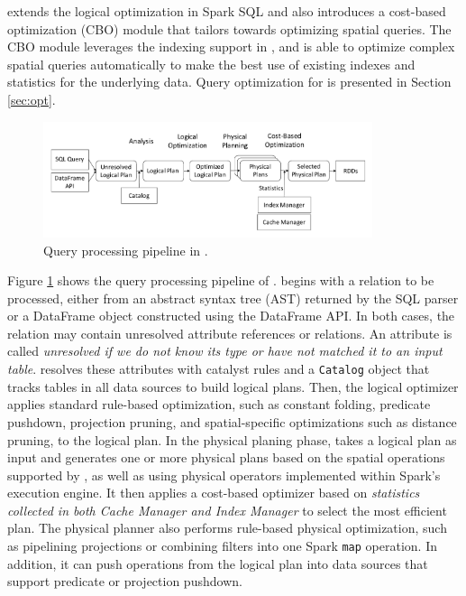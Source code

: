  \name extends the logical optimization in
Spark SQL and also introduces a cost-based optimization (CBO) module
that tailors towards optimizing spatial queries. The CBO module
leverages the indexing support in \name, and is able to optimize
complex spatial queries automatically to make the best use of existing
indexes and statistics for the underlying data. Query optimization for
\name is presented in Section \ref{sec:opt}.

\begin{figure}[t!]
  \hspace*{-8mm}
	\centering
	\includegraphics[width = 3.8in]{figs/pipeline}
	\vspace{-8mm}
	\caption{Query processing pipeline in \name.}
	\label{fig:pipeline}
	\vspace{-4mm}
\end{figure}

 Figure \ref{fig:pipeline} shows the
query processing pipeline of \name. \name begins with a relation to be
processed, either from an abstract syntax tree (AST) returned by the
SQL parser or a DataFrame object constructed using the DataFrame
API. In both cases, the relation may contain unresolved attribute
references or relations. An attribute is called {\em unresolved if we
  do not know its type or have not matched it to an input
  table}. \name resolves these attributes with catalyst rules and a
\texttt{Catalog} object that tracks tables in all data sources to
build logical plans. Then, the logical optimizer applies standard
rule-based optimization, such as constant folding, predicate pushdown,
projection pruning, and spatial-specific optimizations such as
distance pruning, to the logical plan. In the physical planing phase,
\name takes a logical plan as input and generates one or more physical
plans based on the spatial operations supported by \name, as well as
using physical operators implemented within Spark's execution
engine. It then applies a cost-based optimizer based on {\em
  statistics collected in both Cache Manager and Index Manager} to
select the most efficient plan.  The physical planner also performs
rule-based physical optimization, such as pipelining projections or
combining filters into one Spark \texttt{map} operation. In addition,
it can push operations from the logical plan into data sources that
support predicate or projection pushdown.


